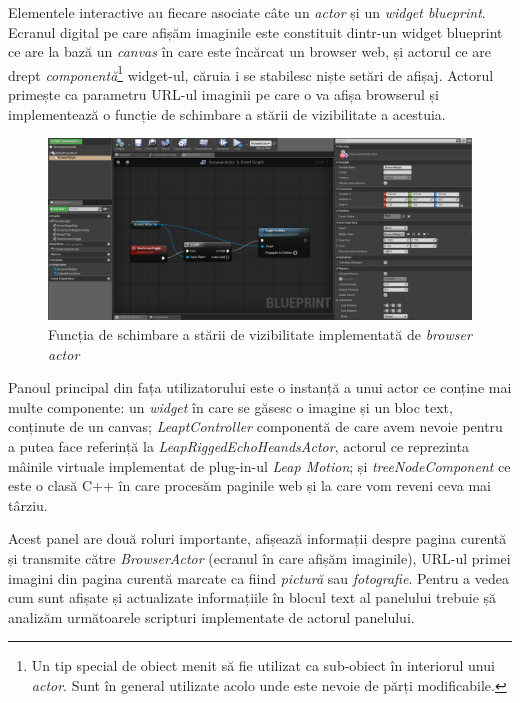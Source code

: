 Elementele interactive au fiecare asociate câte un \textit{actor} și un \textit{widget blueprint}.
Ecranul digital pe care afișăm imaginile este constituit dintr-un widget blueprint ce are la bază un \textit{canvas} în care este încărcat un browser web, și actorul ce are drept \textit{componentă}\footnote{Un tip special de obiect menit să fie utilizat ca sub-obiect în interiorul unui \textit{actor}. Sunt în general utilizate acolo unde este nevoie de părți modificabile.} widget-ul, căruia i se stabilesc niște setări de afișaj. Actorul primește ca parametru URL-ul imaginii pe care o va afișa browserul și implementează o funcție de schimbare a stării de vizibilitate a acestuia.
\newpage

\begin{figure}[h]
  \centering
  \includegraphics[scale=0.28]{img/toggleVisBrowserActor.png}
  \caption{Funcția de schimbare a stării de vizibilitate implementată de \textit{browser actor}}
\end{figure}
 
Panoul principal din fața utilizatorului este o instanță a unui actor ce conține mai multe componente: un \textit{widget} în care se găsesc o imagine și un bloc text, conținute de un canvas; \textit{LeaptController} componentă de care avem nevoie pentru a putea face referință la \textit{LeapRiggedEchoHeandsActor}, actorul ce reprezinta mâinile virtuale implementat de plug-in-ul \textit{Leap Motion}; și \textit{treeNodeComponent} ce este o clasă C++ în care procesăm paginile web și la care vom reveni ceva mai târziu.

Acest panel are două roluri importante, afișează informații despre pagina curentă și transmite către \textit{BrowserActor} (ecranul în care afișăm imaginile), URL-ul primei imagini din pagina curentă marcate ca fiind \textit{pictură} sau \textit{fotografie}.
Pentru a vedea cum sunt afișate și actualizate informațiile în blocul text al panelului trebuie șă analizăm următoarele scripturi implementate de actorul panelului.

